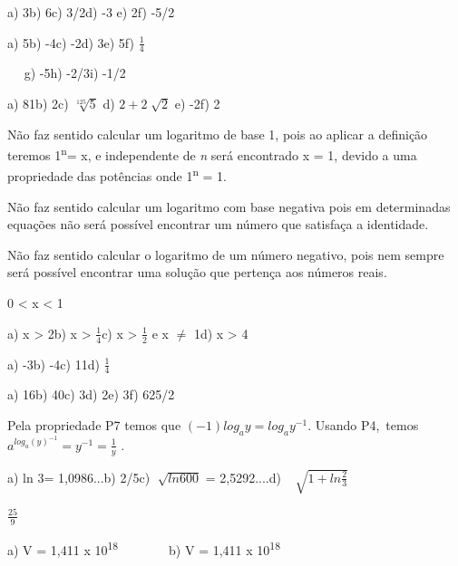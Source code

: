 \begin{respostas}{2}
    \ansitem{} a) 3\quad \quad b) 6\quad \quad c) 3/2\quad \quad d) -3 \quad \quad e) 2\quad \quad f) -5/2

    \ansitem{} a) 5\quad \quad b) -4\quad \quad c) -2\quad \quad d) 3\quad \quad e) 5\quad \quad f) $\frac{1}{4}$

~~ \quad g) -5\quad \quad h) -2/3\quad \quad i) -1/2

    \ansitem{} a) 81\quad \quad b) 2\quad \quad c)  \( \sqrt[125]{5} \) \quad d)  \( 2+2\sqrt[]{2} \) \quad e) -2\quad \quad f) 2

    \ansitem{} Não faz sentido calcular um logaritmo de base 1, pois ao aplicar a definição teremos 1\textsuperscript{n}= x, e independente de \textit{n} será encontrado x = 1, devido a uma propriedade das potências onde 1\textsuperscript{n }= 1.

    \ansitem{} Não faz sentido calcular um logaritmo com base negativa pois em determinadas equações não será possível encontrar um número que satisfaça a identidade.

    \ansitem{}Não faz sentido calcular o logaritmo de um número negativo, pois nem sempre será possível encontrar uma solução que pertença aos números reais.

    \ansitem{} 0 < x < 1

    \ansitem{} a) x > 2\quad b) x > $\frac{1}{4}$\quad c) x > $\frac{1}{2}$ e x $ \neq $  1\quad d) x > 4

\end{respostas}

\begin{respostas}{3}

    \ansitem{} a) -3\quad \quad b) -4\quad \quad c) 11\quad \quad d) $\frac{1}{4}$

    \ansitem{} a) 16\quad \quad b) 40\quad \quad c) 3\quad \quad d) 2\quad \quad e) 3\quad f) 625/2

    \ansitem{} Pela propriedade P7 temos que  \(  \left( -1 \right) log_{a}y=log_{a}y^{-1} \). Usando P4,~temos \( a^{log_{a} \left( y \right) ^{-1}}=y^{-1}=\frac{1}{y} \) .

    \ansitem{} a) ln 3\quad = 1,0986...\quad b) 2/5\quad \quad c)  \( \sqrt[]{ln600} \)  = 2,5292....\quad d)~  \( \sqrt[]{1+ln\frac{2}{3}} \) 

    \ansitem{}  \( \frac{25}{9} \)

    \ansitem{} a) V = 1,411 x 10\textsuperscript{18~~ }~~~~~ b) V = 1,411 x 10\textsuperscript{18}
\end{respostas}

